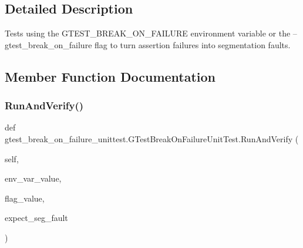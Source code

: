 \subsection{Detailed Description}
\begin{DoxyVerb}Tests using the GTEST_BREAK_ON_FAILURE environment variable or
the --gtest_break_on_failure flag to turn assertion failures into
segmentation faults.
\end{DoxyVerb}
 

\subsection{Member Function Documentation}
\mbox{\label{classgtest__break__on__failure__unittest_1_1GTestBreakOnFailureUnitTest_a0a66475873f545d88655b8bb14368f2e}} 
\subsubsection{\texorpdfstring{Run\+And\+Verify()}{RunAndVerify()}}
{\footnotesize\ttfamily def gtest\+\_\+break\+\_\+on\+\_\+failure\+\_\+unittest.\+G\+Test\+Break\+On\+Failure\+Unit\+Test.\+Run\+And\+Verify (\begin{DoxyParamCaption}\item[{}]{self,  }\item[{}]{env\+\_\+var\+\_\+value,  }\item[{}]{flag\+\_\+value,  }\item[{}]{expect\+\_\+seg\+\_\+fault }\end{DoxyParamCaption})}

